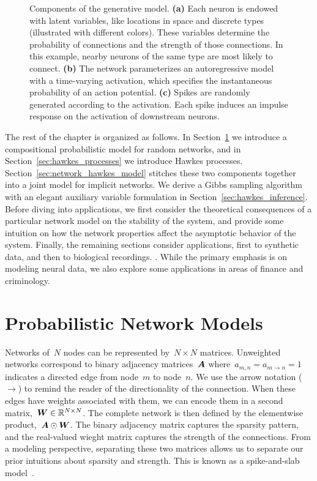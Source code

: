 \begin{figure}[t]
\begin{subfigure}[b]{1.3in}
    \label{fig:fig1_spikes}
  \end{subfigure}
  \vspace{-.2in}
  \caption[Components of the network Hawkes model]{
     Components of the generative model. 
     \textbf{(a)} Each neuron is endowed with latent variables, like 
     locations in space and discrete types (illustrated with different colors).
     These variables determine the probability of connections and the 
     strength of those connections. In this example, nearby neurons of the same 
     type are most likely to connect.
     \textbf{(b)} The network parameterizes an autoregressive model 
     with a time-varying activation, which specifies the instantaneous probability 
     of an action potential.
     \textbf{(c)} Spikes are randomly generated according to the 
     activation. Each spike induces an impulse response on the activation 
     of downstream neurons.}
  \label{fig:network_hawkes}
\end{figure}

The rest of the chapter is organized as follows. In Section~\ref{sec:graph_models}
we introduce a compositional probabilistic model for random networks, and in 
Section~\ref{sec:hawkes_processes} we introduce Hawkes processes. 
Section~\ref{sec:network_hawkes_model} stitches these two components together into a 
joint model for implicit networks. We derive a Gibbs sampling algorithm with
an elegant auxiliary variable formulation in Section~\ref{sec:hawkes_inference}.
Before diving into applications, we first consider the theoretical consequences of a 
particular network model on the stability of the system, and provide some 
intuition on how the network properties affect the asymptotic behavior of the 
system. 
Finally, the remaining sections consider applications, first to synthetic data,
 and then to biological recordings. .
While the primary emphasis is on modeling neural data, we also explore some applications
in areas of finance and criminology. 

\section{Probabilistic Network Models}
\label{sec:graph_models}
Networks of~$N$ nodes can be represented by~${N\times N}$
matrices. Unweighted networks correspond to binary adjacency matrices~$\boldsymbol{A}$
where~${a_{m,n}=a_{m \to n}=1}$ indicates a directed edge from
node~$m$ to node~$n$. We use the arrow notation ($\to$) to remind the
reader of the directionality of the connection. When these edges have
weights associated with them, we can encode them in a second matrix,~${\boldsymbol{W} \in
  \mathbb{R}^{N \times N}}$.  The complete network is then defined by the
elementwise product,~${\boldsymbol{A} \odot \boldsymbol{W}}$. The binary adjacency matrix
captures the sparsity pattern, and the real-valued wieght matrix
captures the strength of the connections. From a modeling perspective,
separating these two matrices allows us to separate our prior
intuitions about sparsity and strength. This is known as a
spike-and-slab model~\cite{Mitchell1988, Mohamed-2012}.


